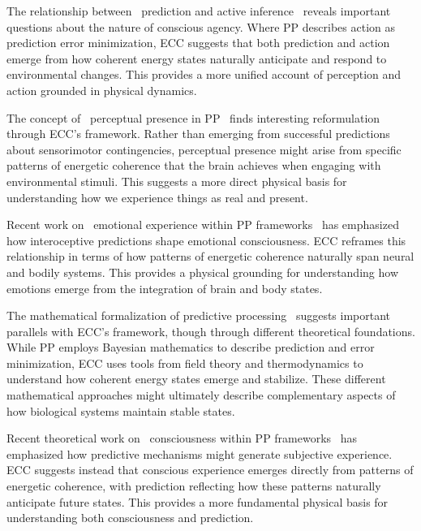 The relationship between~ prediction and active inference~\cite{Seth2016, Clark2019} reveals important questions about the nature of conscious agency. Where PP describes action as prediction error minimization, ECC suggests that both prediction and action emerge from how coherent energy states naturally anticipate and respond to environmental changes. This provides a more unified account of perception and action grounded in physical dynamics.

The concept of~ perceptual presence in PP~\cite{Seth2014, Clark2016} finds interesting reformulation through ECC's framework. Rather than emerging from successful predictions about sensorimotor contingencies, perceptual presence might arise from specific patterns of energetic coherence that the brain achieves when engaging with environmental stimuli. This suggests a more direct physical basis for understanding how we experience things as real and present.

Recent work on~ emotional experience within PP frameworks~\cite{Seth2012, barrett2017emotions} has emphasized how interoceptive predictions shape emotional consciousness. ECC reframes this relationship in terms of how patterns of energetic coherence naturally span neural and bodily systems. This provides a physical grounding for understanding how emotions emerge from the integration of brain and body states.

 The mathematical formalization of predictive processing~\cite{Friston2009, Friston2010} suggests important parallels with ECC's framework, though through different theoretical foundations. While PP employs Bayesian mathematics to describe prediction and error minimization, ECC uses tools from field theory and thermodynamics to understand how coherent energy states emerge and stabilize. These different mathematical approaches might ultimately describe complementary aspects of how biological systems maintain stable states.

Recent theoretical work on~ consciousness within PP frameworks~\cite{Seth2016, Seth2021} has emphasized how predictive mechanisms might generate subjective experience. ECC suggests instead that conscious experience emerges directly from patterns of energetic coherence, with prediction reflecting how these patterns naturally anticipate future states. This provides a more fundamental physical basis for understanding both consciousness and prediction.

